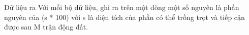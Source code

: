 Dữ liệu ra
Với mỗi bộ dữ liệu, ghi ra trên một dòng một số nguyên là phần nguyên của (s * 100) với s là diện tích của phần có thể trồng trọt và tiếp cận được sau M trận động đất.